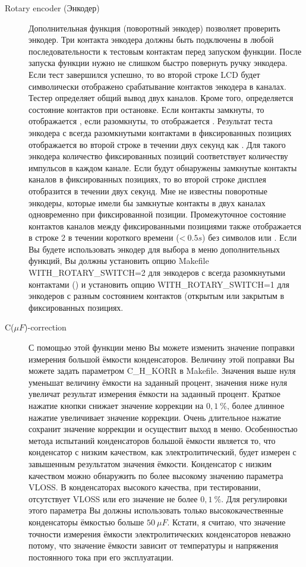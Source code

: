 \begin{description}
 \item[Rotary encoder (Энкодер)]
 Дополнительная функция  (поворотный энкодер) позволяет проверить энкодер.
Три контакта энкодера должны быть подключены в любой последовательности к тестовым контактам 
перед запуском функции.
После запуска функции нужно не слишком быстро повернуть ручку энкодера. 
Если тест завершился успешно, то во второй строке LCD будет символически отображено срабатывание 
контактов энкодера в каналах.
Тестер определяет общий вывод двух каналов. 
Кроме того, определяется состояние контактов при остановке. Если контакты замкнуты, то 
отображается , если разомкнуты, то отображается .
Результат теста энкодера с всегда разомкнутыми контактами в фиксированных позициях отображается во 
второй строке в течении двух секунд как .
Для такого энкодера количество фиксированных позиций соответствует количеству импульсов в каждом канале.
Если будут обнаружены замкнутые контакты каналов в фиксированных позициях, то во второй строке
дисплея отобразится  в течении двух секунд.
Мне не известны поворотные энкодеры, которые имели бы замкнутые контакты в двух каналах одновременно
при фиксированной позиции.
Промежуточное состояние контактов каналов между фиксированными позициями также отображается в строке 2
в течении короткого времени (\textless\(~0.5s\)) без символов  или .
Если Вы будете использовать энкодер для выбора в меню дополнительных функций, Вы должны установить опцию 
Makefile WITH\_ROTARY\_SWITCH=2 для энкодеров с всегда разомкнутыми контактами ()  и установить опцию 
WITH\_ROTARY\_SWITCH=1 для энкодеров с разным состоянием контактов (открытым  или закрытым  в 
фиксированных позициях.\\

\item[C(\(\mu F\))-correction]
С помощью этой функции меню Вы можете изменить значение поправки измерения большой ёмкости конденсаторов.
Величину этой поправки Вы можете задать параметром C\_H\_KORR в Makefile.
Значения выше нуля уменьшат величину ёмкости на заданный процент, значения ниже нуля увеличат результат
измерения ёмкости на заданный процент.
Краткое нажатие кнопки снижает значение коррекции на \(0,1~\%\), более длинное нажатие увеличивает значение коррекции.
Очень длительное нажатие сохранит значение коррекции и осуществит выход в меню.
Особенностью метода испытаний конденсаторов большой ёмкости является то, что конденсатор с низким качеством,
как электролитический, будет измерен с завышенным результатом значения ёмкости.
Конденсатор с низким качеством можно обнаружить по более высокому значению параметра VLOSS.
В конденсаторах высокого качества, при тестировании, отсутствует VLOSS или его значение не более \(0,1~\%\).
Для регулировки этого параметра Вы должны использовать только высококачественные конденсаторы ёмкостью больше \(50~\mu F\).
Кстати, я считаю, что значение точности измерения ёмкости электролитических конденсаторов неважно потому,
что значение ёмкости зависит от температуры и напряжения постоянного тока при его эксплуатации.


\end{description}
